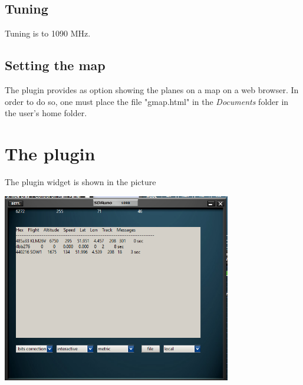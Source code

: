 \documentclass[11pt]{article}
\begin{document}
\subsection{Tuning}
Tuning is to 1090 MHz.

\subsection{Setting the map}
The plugin provides as option showing the planes on a map on a web browser.
In order to do so, one must place the file "gmap.html" in the {\em Documents}
folder in the user's home folder.

\section{The plugin}
The plugin widget  is shown in the picture

\includegraphics[width=100mm]{1090-widget.png}
\end{document}
